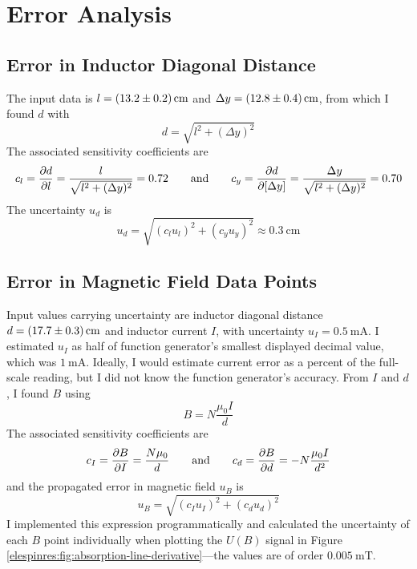 \documentclass[11pt, a4paper]{article}
\newcommand{\eqtext}[1]{\qquad \text{#1} \qquad}
\begin{document}
	

\section{Error Analysis}

\subsection{Error in Inductor Diagonal Distance}
The input data is $ l = \SI{13.2 \pm 0.2}{\centi \meter} $ and $ \Delta y = \SI{12.8\pm 0.4}{\centi \meter} $, from which I found $ d $ with
\begin{equation*}
	d = \sqrt{l^{2} + (\Delta y)^{2}}
\end{equation*}
The associated sensitivity coefficients are
\begin{equation*}
	c_{l} = \pdv{d}{l} = \frac{l}{\sqrt{l^{2} + (\Delta y)^{2}}} = 0.72 \eqtext{and} c_{y} = \pdv{d}{[\Delta y]} = \frac{\Delta y}{\sqrt{l^{2} + (\Delta y)^{2}}} = 0.70
\end{equation*}
The uncertainty $ u_{d} $ is
\begin{equation*}
	u_{d} = \sqrt{(c_{l}u_{l})^{2} + (c_{y}u_{y})^{2}} \approx \SI{0.3}{\centi \meter} 
\end{equation*}

\subsection{Error in Magnetic Field Data Points}
Input values carrying uncertainty are inductor diagonal distance $ d = \SI{17.7 \pm 0.3}{\centi \meter} $ and inductor current $ I $, with uncertainty $ u_{I} = \SI{0.5}{\milli \ampere} $. I estimated $ u_{I} $ as half of function generator's smallest displayed decimal value, which was $ \SI{1}{\milli \ampere} $. Ideally, I would estimate current error as a percent of the full-scale reading, but I did not know the function generator's accuracy. From $ I $ and $ d $, I found $ B $ using
\begin{equation*}
	B = N\frac{\mu_{0}I}{d}
\end{equation*}
The associated sensitivity coefficients are
\begin{equation*}
	c_{I} = \pdv{B}{I} = \frac{N\mu_{0}}{d} \eqtext{and} c_{d} = \pdv{B}{d} = - N\frac{\mu_{0}I}{d^{2}}
\end{equation*}
and the propagated error in magnetic field $ u_{B} $ is
\begin{equation*}
	u_{B} = \sqrt{(c_{I}u_{I})^{2} + (c_{d}u_{d})^{2}}
\end{equation*}
I implemented this expression programmatically and calculated the uncertainty of each $ B $ point individually when plotting the $ U(B) $ signal in Figure \ref{elespinres:fig:absorption-line-derivative}---the values are of order $ \SI{0.005}{\milli \tesla} $.
\end{document}
